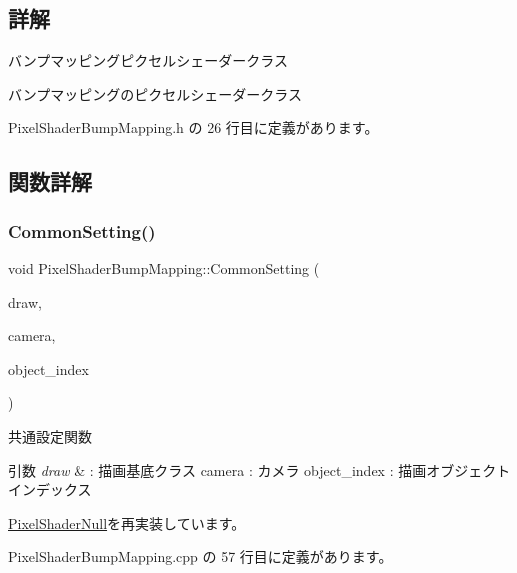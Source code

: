 \subsection{詳解}
バンプマッピングピクセルシェーダークラス 

バンプマッピングのピクセルシェーダークラス 

 Pixel\+Shader\+Bump\+Mapping.\+h の 26 行目に定義があります。



\subsection{関数詳解}
\mbox{\label{class_pixel_shader_bump_mapping_af62a2b40930533a3bae17319f876705d}} 
\subsubsection{\texorpdfstring{Common\+Setting()}{CommonSetting()}}
{\footnotesize\ttfamily void Pixel\+Shader\+Bump\+Mapping\+::\+Common\+Setting (\begin{DoxyParamCaption}\item[{\mbox{\hyperlink{class_draw_base}{Draw\+Base}} $\ast$}]{draw,  }\item[{\mbox{\hyperlink{class_camera}{Camera}} $\ast$}]{camera,  }\item[{unsigned}]{object\+\_\+index }\end{DoxyParamCaption})\hspace{0.3cm}{\ttfamily [virtual]}}



共通設定関数 


\begin{DoxyParams}{引数}
{\em draw} & \+: 描画基底クラス camera \+: カメラ object\+\_\+index \+: 描画オブジェクトインデックス \\
\hline
\end{DoxyParams}


\mbox{\hyperlink{class_pixel_shader_null_a99c712ab174da29ba26a893820b64799}{Pixel\+Shader\+Null}}を再実装しています。



 Pixel\+Shader\+Bump\+Mapping.\+cpp の 57 行目に定義があります。

